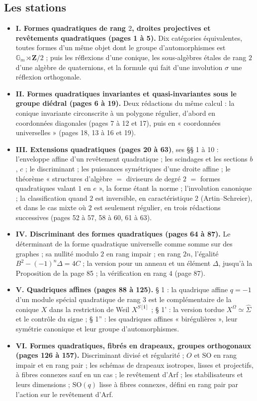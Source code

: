 \documentclass[11pt,a4paper]{article}
\begin{document}
\subsection*{Les stations}

\begin{itemize}
  \item \textbf{I. Formes quadratiques de rang $2$, droites projectives et
    revêtements quadratiques (pages 1 à 5).} Dix catégories équivalentes,
    toutes formes d'un même objet dont le groupe d'automorphismes est
    $\mathbb{G}_m \rtimes \mathbf{Z}/2$ ; puis les réflexions d'une conique,
    les sous-algèbres étales de rang $2$ d'une algèbre de quaternions, et la
    formule qui fait d'une involution $\sigma$ une réflexion orthogonale.
  \item \textbf{II. Formes quadratiques invariantes et quasi-invariantes sous
    le groupe diédral (pages 6 à 19).} Deux rédactions du même calcul : la
    conique invariante circonscrite à un polygone régulier, d'abord en
    coordonnées diagonales (pages 7 à 12 et 17), puis en « coordonnées
    universelles » (pages 18, 13 à 16 et 19).
  \item \textbf{III. Extensions quadratiques (pages 20 à 63)}, ses §§ 1 à 10 :
    l'enveloppe affine d'un revêtement quadratique ; les scindages et les
    sections $b$, $c$ ; le discriminant ; les puissances symétriques d'une
    droite affine ; le théorème « structures d'algèbre $=$ diviseurs de degré
    $2$ $=$ formes quadratiques valant $1$ en $e$ », la forme étant la norme ;
    l'involution canonique ; la classification quand $2$ est inversible, en
    caractéristique $2$ (Artin--Schreier), et dans le cas mixte où $2$ est
    seulement régulier, en trois rédactions successives (pages 52 à 57, 58 à
    60, 61 à 63).
  \item \textbf{IV. Discriminant des formes quadratiques (pages 64 à 87).} Le
    déterminant de la forme quadratique universelle comme somme sur des
    graphes ; sa nullité modulo $2$ en rang impair ; en rang $2n$, l'égalité
    $B^2 - (-1)^n \Delta = 4C$ ; la version pour un anneau et un élément
    $\Delta$, jusqu'à la Proposition de la page 85 ; la vérification en rang
    $4$ (page 87).
  \item \textbf{V. Quadriques affines (pages 88 à 125).} § 1 : la quadrique
    affine $q = -1$ d'un module spécial quadratique de rang $3$ est le
    complémentaire de la conique $X$ dans la restriction de Weil
    $X^{S[\mathbf{i}]}$ ; § 1' : la version tordue $X^{\Omega} \simeq
    \hat{\Sigma}$ et le contrôle du signe ; § 1'' : les quadriques affines
    « birégulières », leur symétrie canonique et leur groupe d'automorphismes.
  \item \textbf{VI. Formes quadratiques, fibrés en drapeaux, groupes
    orthogonaux (pages 126 à 157).} Discriminant divisé et régularité ; $O$ et
    $\mathrm{SO}$ en rang impair et en rang pair ; les schémas de drapeaux
    isotropes, lisses et projectifs, à fibres connexes sauf en un cas ; le
    revêtement d'Arf ; les stabilisateurs et leurs dimensions ; $\mathrm{SO}(q)$
    lisse à fibres connexes, défini en rang pair par l'action sur le
    revêtement d'Arf.
\end{itemize}
\end{document}
